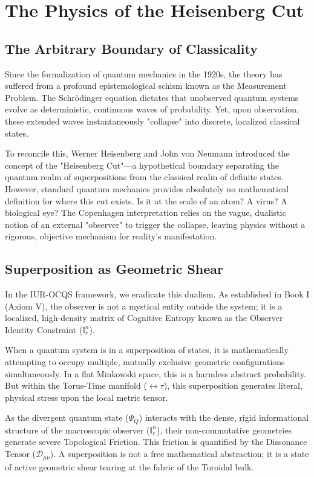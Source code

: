 \documentclass[12pt,openany]{book}
\begin{document}
\chapter{The Physics of the Heisenberg Cut}

\section{The Arbitrary Boundary of Classicality}
Since the formalization of quantum mechanics in the 1920s, the theory has suffered from a profound epistemological schism known as the Measurement Problem. The Schrödinger equation dictates that unobserved quantum systems evolve as deterministic, continuous waves of probability. Yet, upon observation, these extended waves instantaneously "collapse" into discrete, localized classical states.

To reconcile this, Werner Heisenberg and John von Neumann introduced the concept of the "Heisenberg Cut"—a hypothetical boundary separating the quantum realm of superpositions from the classical realm of definite states. However, standard quantum mechanics provides absolutely no mathematical definition for where this cut exists. Is it at the scale of an atom? A virus? A biological eye? The Copenhagen interpretation relies on the vague, dualistic notion of an external "observer" to trigger the collapse, leaving physics without a rigorous, objective mechanism for reality's manifestation.

\section{Superposition as Geometric Shear}
In the IUR-OCQS framework, we eradicate this dualism. As established in Book I (Axiom V), the observer is not a mystical entity outside the system; it is a localized, high-density matrix of Cognitive Entropy known as the Observer Identity Constraint ($\mathbb{I}_r^n$). 

When a quantum system is in a superposition of states, it is mathematically attempting to occupy multiple, mutually exclusive geometric configurations simultaneously. In a flat Minkowski space, this is a harmless abstract probability. But within the Torus-Time manifold ($\leftrightarrow\tau$), this superposition generates literal, physical stress upon the local metric tensor. 

As the divergent quantum state ($\Psi_Q$) interacts with the dense, rigid informational structure of the macroscopic observer ($\mathbb{I}_r^n$), their non-commutative geometries generate severe Topological Friction. This friction is quantified by the Dissonance Tensor ($\mathcal{D}_{\mu\nu}$). A superposition is not a free mathematical abstraction; it is a state of active geometric shear tearing at the fabric of the Toroidal bulk.
\end{document}
